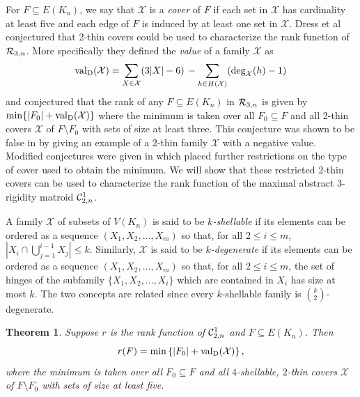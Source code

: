 \documentclass{daj}
\newtheorem{theorem}[thm]{Theorem}\theoremstyle{plain}
\newcommand{\MX}{{\mathcal X}}
\newcommand{\valD}{{\rm val}_{\rm D}}
\begin{document}
For $F\subseteq E(K_n)$, we say that $\MX$ is a {\em cover} of $F$
if each set in $\MX$ has cardinality at least five and each edge of $F$ is induced by at least one set in $\MX$. 
Dress et al~\cite{DDH83} conjectured that 2-thin covers could be used to characterize the rank function of  
${\cal R}_{3,n}$. More specifically they defined
the {\em value} of a family $\MX$ as
$$\valD(\MX)= \sum _{X\in \MX}(3|X|-6)\,-\sum_{h\in H(\MX)}(\deg_\MX(h)-1)$$
and conjectured that the rank of any $F\subseteq E(K_n)$ in ${\cal R}_{3,n}$ is given by $\min\{|F_0|+{\valD}(\MX)\}$ where the minimum is taken over all $F_0\subseteq F$ and all 2-thin covers $\MX$ of $F\setminus F_0$ with sets of size at least three. This conjecture was shown to be false in \cite{JJ05} by giving an example of a 2-thin family $\MX$ with a negative value. Modified conjectures were given in \cite{JJ06, JDIMACS} which placed further restrictions on the type of cover used to obtain the minimum.
We will show that these restricted 2-thin covers can be used to characterize the rank function of the maximal abstract 3-rigidity matroid ${\cal C}^1_{2,n}$. 

A family $\MX$ of subsets of $V(K_n)$ 
is said to be {\em $k$-shellable} if its elements  can be ordered as a sequence $(X_1,X_2,\ldots,X_m)$ so that, for all $2\leq i\leq m$, 
$|X_i\cap \bigcup_{j=1}^{i-1}X_j|\leq k$.
Similarly,  $\MX$  is said to be {\em $k$-degenerate} if its elements  can be ordered as a sequence $(X_1,X_2,\ldots,X_m)$ so that, for all $2\leq i\leq m$, the set of hinges of the subfamily $\{X_1,X_2,\ldots,X_{i}\}$ which are contained in $X_{i}$ has size at most $k$. The two concepts are 
related since 
every $k$-shellable family is ${{k}\choose{2}}$-degenerate. 

\begin{theorem}\label{thm:rankcover}
Suppose $r$ is the rank function of ${\cal C}^1_{2,n}$ and $F\subseteq E(K_n)$.
Then
\begin{equation}\label{eq:rankcover}
r(F)=\min\left\{|F_0|+\valD(\MX) \right\},
\end{equation}
where the minimum is taken over all $F_0\subseteq F$ and all $4$-shellable,
$2$-thin
covers $\MX$ of $F\setminus F_0$  with sets of size at least five.
\end{theorem}
\end{document}
